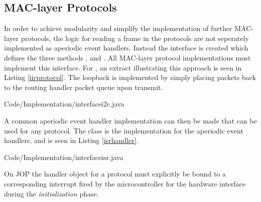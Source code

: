 \subsection{MAC-layer Protocols} %
\label{sub:mac_layer_protocols}
In order to achieve modularity and simplify the implementation of further MAC-layer protocols, the logic for reading a frame in the protocols are not seperately implemented as aperiodic event handlers. Instead the interface  is created which defines the three methods ,  and . All MAC-layer protocol implementations must implement this interface. For \iic, an extract illustrating this approach is seen in Listing \ref{iicprotocol}. The loopback is implemented by simply placing packets back to the routing handler packet queue upon transmit.

{Code/Implementation/interfacei2c.java}

A common aperiodic event handler implementation can then be made that can be used for any protocol. The class  is the implementation for the aperiodic event handlers, and is seen in Listing \ref{isrhandler}.

{Code/Implementation/interfaceisr.java}

On JOP the handler object for a protocol must explicitly be bound to a corresponding interrupt fired by the microcontroller for the hardware interface during the \textit{initialization} phase.


